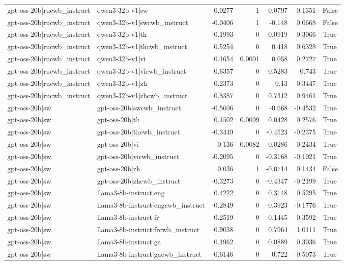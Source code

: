 \begin{table}
\begin{tabular}{l l r r r r l}
gpt-oss-20b|rucwb_instruct & qwen3-32b-v1|sw & 0.0277 & 1 & -0.0797 & 0.1351 & False \\
gpt-oss-20b|rucwb_instruct & qwen3-32b-v1|swcwb_instruct & -0.0406 & 1 & -0.148 & 0.0668 & False \\
gpt-oss-20b|rucwb_instruct & qwen3-32b-v1|th & 0.1993 & 0 & 0.0919 & 0.3066 & True \\
gpt-oss-20b|rucwb_instruct & qwen3-32b-v1|thcwb_instruct & 0.5254 & 0 & 0.418 & 0.6328 & True \\
gpt-oss-20b|rucwb_instruct & qwen3-32b-v1|vi & 0.1654 & 0.0001 & 0.058 & 0.2727 & True \\
gpt-oss-20b|rucwb_instruct & qwen3-32b-v1|vicwb_instruct & 0.6357 & 0 & 0.5283 & 0.743 & True \\
gpt-oss-20b|rucwb_instruct & qwen3-32b-v1|zh & 0.2373 & 0 & 0.13 & 0.3447 & True \\
gpt-oss-20b|rucwb_instruct & qwen3-32b-v1|zhcwb_instruct & 0.8387 & 0 & 0.7312 & 0.9461 & True \\
gpt-oss-20b|sw & gpt-oss-20b|swcwb_instruct & -0.5606 & 0 & -0.668 & -0.4532 & True \\
gpt-oss-20b|sw & gpt-oss-20b|th & 0.1502 & 0.0009 & 0.0428 & 0.2576 & True \\
gpt-oss-20b|sw & gpt-oss-20b|thcwb_instruct & -0.3449 & 0 & -0.4523 & -0.2375 & True \\
gpt-oss-20b|sw & gpt-oss-20b|vi & 0.136 & 0.0082 & 0.0286 & 0.2434 & True \\
gpt-oss-20b|sw & gpt-oss-20b|vicwb_instruct & -0.2095 & 0 & -0.3168 & -0.1021 & True \\
gpt-oss-20b|sw & gpt-oss-20b|zh & 0.036 & 1 & -0.0714 & 0.1434 & False \\
gpt-oss-20b|sw & gpt-oss-20b|zhcwb_instruct & -0.3273 & 0 & -0.4347 & -0.2199 & True \\
gpt-oss-20b|sw & llama3-8b-instruct|eng & 0.4222 & 0 & 0.3148 & 0.5295 & True \\
gpt-oss-20b|sw & llama3-8b-instruct|engcwb_instruct & -0.2849 & 0 & -0.3923 & -0.1776 & True \\
gpt-oss-20b|sw & llama3-8b-instruct|fr & 0.2519 & 0 & 0.1445 & 0.3592 & True \\
gpt-oss-20b|sw & llama3-8b-instruct|frcwb_instruct & 0.9038 & 0 & 0.7964 & 1.0111 & True \\
gpt-oss-20b|sw & llama3-8b-instruct|ga & 0.1962 & 0 & 0.0889 & 0.3036 & True \\
gpt-oss-20b|sw & llama3-8b-instruct|gacwb_instruct & -0.6146 & 0 & -0.722 & -0.5073 & True \\

\end{tabular}
\end{table}
